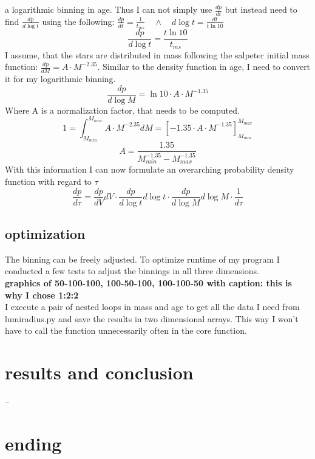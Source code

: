 \documentclass[a4paper,10pt]{article}
\begin{document}
 a logarithmic binning in age. Thus I can not simply use $\frac{dp}{dt}$ but instead need to find $\frac{dp}{d\log t}$ using the following:
  $\frac{dp}{dt}=\frac{1}{t_{ms}}\quad \land \quad d\log t=\frac{dt}{t \ln 10}$
 \begin{equation}
  \frac{dp}{d\log t}=\frac{t\ln 10}{t_{ms}}
 \end{equation}
 I assume, that the stars are distributed in mass following the salpeter initial mass function: $\frac{dp}{dM}=A\cdot M^{-2.35}$. Similar
 to the density function in age, I need to convert it for my logarithmic binning. 
 \begin{equation}
  \frac{dp}{d\log M}=\ln 10 \cdot A\cdot M^{-1.35}
 \end{equation}
 Where A is a normalization factor, that needs to be computed. 
 \begin{equation}
  1=\int_{M_{min}}^{M_{max}}A\cdot M^{-2.35} dM =\left[ -1.35\cdot A\cdot M^{-1.35}\right]_{M_{min}}^{M_{max}}
 \end{equation}
 \begin{equation}
  A= \frac{1.35}{M_{min}^{-1.35}-M_{max}^{-1.35}}
 \end{equation}
 With this information I can now formulate an overarching probability density function with regard to $\tau$
 \begin{equation}
  \frac{dp}{d\tau}=\frac{dp}{dV}dV \cdot \frac{dp}{d\log t}d\log t \cdot \frac{dp}{d\log M}d\log M\cdot \frac{1}{d\tau}
 \end{equation}
 

 
 \subsection{optimization}
 The binning can be freely adjusted. To optimize runtime of my program I conducted a few tests to adjust the binnings in all three dimensions.\\
 \textbf{graphics of 50-100-100, 100-50-100, 100-100-50 with caption: this is why I chose 1:2:2}\\
 
 I execute a pair of nested loops in mass and age to get all the data I need from lumiradius.py and save the results in two dimensional
 arrays. This way I won't have to call the function unnecessarily often in the core function.
 \section{results and conclusion}
 --
 \section{ending}
\end{document}
